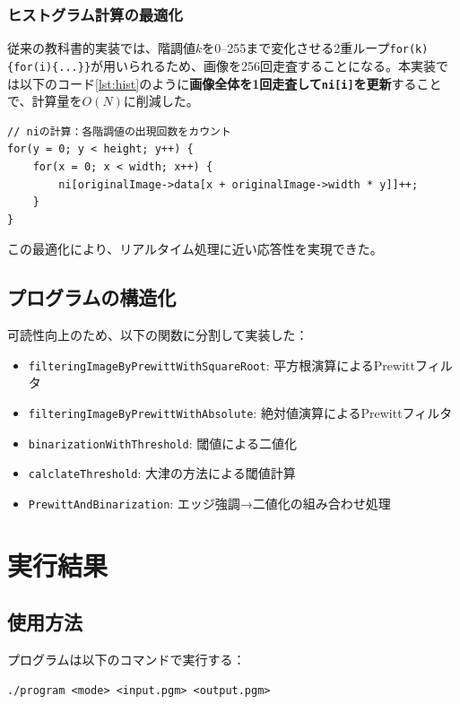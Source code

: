 \documentclass[a4paper,12pt]{jsarticle}
\begin{document}
\subsubsection{ヒストグラム計算の最適化}
従来の教科書的実装では、階調値$k$を0–255まで変化させる2重ループ\texttt{for(k)\{for(i)\{...\}\}}が用いられるため、画像を256回走査することになる。本実装では以下のコード\ref{lst:hist}のように\textbf{画像全体を1回走査して\texttt{ni[i]}を更新}することで、計算量を$O(N)$に削減した。

\begin{lstlisting}[caption=効率的なヒストグラム計算,label=lst:hist]
// niの計算：各階調値の出現回数をカウント
for(y = 0; y < height; y++) {
    for(x = 0; x < width; x++) {
        ni[originalImage->data[x + originalImage->width * y]]++;
    }
}
\end{lstlisting}

この最適化により、リアルタイム処理に近い応答性を実現できた。

\subsection{プログラムの構造化}
可読性向上のため、以下の関数に分割して実装した：

\begin{itemize}
\item \texttt{filteringImageByPrewittWithSquareRoot}: 平方根演算によるPrewittフィルタ
\item \texttt{filteringImageByPrewittWithAbsolute}: 絶対値演算によるPrewittフィルタ
\item \texttt{binarizationWithThreshold}: 閾値による二値化
\item \texttt{calclateThreshold}: 大津の方法による閾値計算
\item \texttt{PrewittAndBinarization}: エッジ強調→二値化の組み合わせ処理
\end{itemize}

\section{実行結果}

\subsection{使用方法}
プログラムは以下のコマンドで実行する：

\begin{verbatim}
./program <mode> <input.pgm> <output.pgm>
\end{verbatim}
\end{document}
